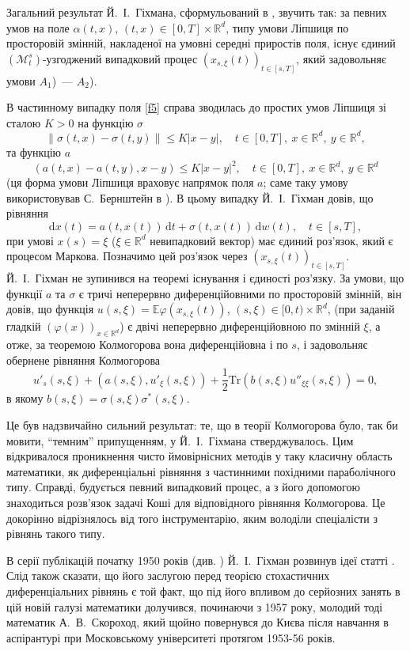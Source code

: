 \documentclass[11pt, reqno]{amsart}
\begin{document}
Загальний результат Й.~І.~Гіхмана, сформульований в \cite{b6}, звучить так: за певних умов на поле $\alpha(t,x)$, $(t,x) \in [0,T]\times \mathbb{R}^d$, типу умови Ліпшиця по просторовій змінній, накладеної на умовні середні приростів поля, існує єдиний $(\mathcal{M}_{t}^s)$-узгоджений випадковий процес $(x_{s,\xi}(t))_{t\in[s,T]}$, який задовольняє умови $A_1$)~--- $A_2$).

В частинному випадку поля \eqref{f5} справа зводилась до простих умов Ліпшиця зі сталою $K > 0$ на функцію $\sigma$
\[
\| \sigma(t,x)- \sigma(t,y)\| \leq K |x-y|,\quad t \in [0,T],\ x \in \mathbb{R}^d,\ y \in \mathbb{R}^d,
\]
та функцію $a$
\[
(a(t,x)-a(t,y), x-y) \leq K |x-y|^2,\quad t \in [0,T],\ x \in \mathbb{R}^d,\ y \in \mathbb{R}^d
\]
(ця форма умови Ліпшиця враховує напрямок поля $a$; саме таку умову використовував С.~Бернштейн в \cite{b4}). В цьому випадку Й.~І.~Гіхман довів, що рівняння
\[
\mathrm{d}x(t) = a(t,x(t))\,\mathrm{d}t+\sigma(t,x(t))\,\mathrm{d}w(t),\quad t \in [s,T],
\]
при умові $x(s)= \xi$ ($\xi \in \mathbb{R}^d$ невипадковий вектор) має єдиний роз'язок, який є процесом Маркова. Позначимо цей роз'язок через $(x_{s,\xi}(t))_{t\in[s,T]}$. Й.~І.~Гіхман не зупинився на теоремі існування і єдиності роз'язку. За умови, що функції $a$ та $\sigma$ є тричі неперервно диференційовними по просторовій змінній, він довів, що функція $u(s,\xi) = \mathbb{E} \varphi(x_{s,\xi}(t))$, $(s,\xi)\in [0,t)\times \mathbb{R}^d$, (при заданій гладкій $(\varphi(x))_{x \in \mathbb{R}^d}$) є двічі неперервно диференційовною по змінній $\xi$, а отже, за теоремою Колмогорова вона диференційовна і по $s$, і задовольняє обернене рівняння Колмогорова
\[
u'_{s}(s,\xi )+\left(a(s,\xi ), u'_{\xi}(s,\xi)\right) + \frac{1}{2} \mathrm{Tr}\left(b \left(s, \xi \right)u''_{\xi\xi}(s,\xi)\right) = 0,
\]
в якому $b \left(s, \xi \right ) = \sigma\left(s, \xi \right) \sigma^*\left(s, \xi \right)$.

Це був надзвичайно сильний результат: те, що в теорії Колмогорова було, так би мовити, ``темним'' припущенням, у Й.~І.~Гіхмана стверджувалось. Цим відкривалося проникнення чисто ймовірнісних методів у таку класичну область математики, як диференціальні рівняння з частинними похідними параболічного типу. Справді, будується певний випадковий процес, а з його допомогою знаходиться розв’язок задачі Коші для відповідного рівняння Колмогорова. Це докорінно відрізнялось від того інструментарію, яким володіли спеціалісти з рівнянь такого типу.

В серії публікацій початку 1950 років (див. \cite{b7,b8}) Й.~І.~Гіхман розвинув ідеї статті \cite{b6}. Слід також сказати, що його заслугою перед теорією стохастичних диференціальних рівнянь є той факт, що під його впливом до серйозних занять в цій новій галузі математики долучився, починаючи з 1957 року, молодий тоді математик А.~В.~Скороход, який щойно повернувся до Києва після навчання в аспірантурі при Московському університеті протягом 1953-56 років.
\end{document}

